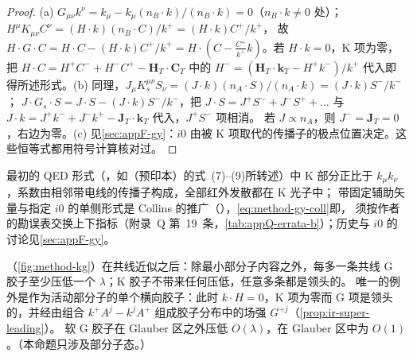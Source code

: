 \begin{proof}
(a) $G_{\mu\nu}k^\nu=k_\mu-k_\mu(n_B\cdot k)/(n_B\cdot k)=0$（$n_B\cdot k\neq0$ 处）；$H^\mu K_{\mu\nu}C^\nu=(H\cdot k)(n_B\cdot C)/k^+=(H\cdot k)C^+/k^+$，
故 $H\cdot G\cdot C=H\cdot C-(H\cdot k)C^+/k^+=H\cdot(C-\frac{C^+}{k^+}k)$。若 $H\cdot k=0$，K 项为零，把 $H\cdot C=H^+C^-+H^-C^+-\mathbf H_T\cdot\mathbf C_T$ 中的
$H^-=(\mathbf H_T\cdot\mathbf k_T-H^+k^-)/k^+$ 代入即得所述形式。(b) 同理，$J_\mu K_s^{\mu\nu}S_\nu=(J\cdot k)(n_A\cdot S)/(n_A\cdot k)=(J\cdot k)S^-/k^-$；
$J\cdot G_s\cdot S=J\cdot S-(J\cdot k)S^-/k^-$，把 $J\cdot S=J^+S^-+J^-S^++\ldots$ 与 $J\cdot k=J^+k^-+J^-k^+-\mathbf J_T\cdot\mathbf k_T$ 代入，$J^+S^-$ 项相消。
若 $J\propto n_A$，则 $J^-=\mathbf J_T=0$，右边为零。(c) 见\cref{sec:appF-gy}：$i0$ 由被 K 项取代的传播子的极点位置决定。这些恒等式都用符号计算核对过。%
\end{proof}

最初的 QED 形式（\cite{GrammerYennie1973}，如\cite{SenIndumathiChoudhury2019}（预印本）的式~(7)--(9)所转述）中 K 部分正比于 $k_\mu k_\nu$，系数由相邻带电线的传播子构成，全部红外发散都在 K 光子中；
带固定辅助矢量与指定 $i0$ 的单侧形式是 Collins 的推广（\cite[第~5.5.6、10.6、11.9.3~节]{Collins2011}），\cref{eq:method-gy-coll}即\cite[式~(11.4)--(11.6)，第~402~页]{Collins2011}，
须按作者的勘误表交换上下指标（附录~Q 第~19~条，\cref{tab:appQ-errata-b}）；历史与 $i0$ 的讨论见\cref{sec:appF-gy}。


\begin{proposition}\label{prop:method-gy-suppression}
（\cref{fig:method-kg}）在共线近似之后：除最小部分子内容之外，每多一条共线 G 胶子至少压低一个 $\lambda$；K 胶子不带来任何压低，任意多条都是领头的。
唯一的例外是作为活动部分子的单个横向胶子：此时 $k\cdot H=0$，K 项为零而 G 项是领头的，并经由组合 $k^+A^j-k^jA^+$ 组成胶子分布中的场强 $G^{+j}$（\cref{prop:ir-super-leading}）。
软 G 胶子在 Glauber 区之外压低 $O(\lambda)$，在 Glauber 区中为 $O(1)$。（本命题只涉及部分子态。）
\end{proposition}

